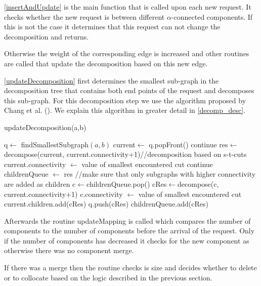 \documentclass[a4paper,xcolor=dvipsnames, tikz, 12pt]{article}
\theoremstyle{definition}
\begin{document}
\cref{insertAndUpdate} is the main function that is called upon each new request. It checks whether the new request is between different $\alpha$-connected components. If this is not the case it determines that this request can not change the decomposition and returns.

Otherwise the weight of the corresponding edge is increased and other routines are called that update the decomposition based on this new edge.

\cref{updateDecomposition} first determines the smallest sub-graph in the decomposition tree that contains both end points of the request and decomposes this sub-graph. For this decomposition step we use the algorithm proposed by Chang et al. (\cite{Chang2013}). We explain this algorithm in greater detail in \cref{decomp_desc}.

\begin{algorithm}
	\caption{updateDecomposition(a,b)}
	\label{updateDecomposition}
	\begin{algorithmic}
		\STATE q$\leftarrow$ findSmallestSubgraph$(a,b)$
		\STATE current$\leftarrow$ q.popFront()
		\STATE continue
		\ENDIF
		\STATE res$\leftarrow$ decompose(current, current.connectivity+1)//decomposition based on s-t-cuts
		\STATE current.connectivity $\leftarrow$ value of smallest encountered cut
		\STATE continue
		\ENDIF
		\STATE childrenQueue $\leftarrow$ res
		\STATE //make sure that only subgraphs with higher connectivity are added as children
		\STATE c$\leftarrow$childrenQueue.pop()
		\STATE cRes$\leftarrow$decompose(c, current.connectivity+1)
		\STATE c.connectivity $\leftarrow$ value of smallest encountered cut
		\STATE current.children.add(cRes)
		\STATE q.push(cRes)
		\ENDIF
		\ELSE
		\STATE childrenQueue.add(cRes)
		\ENDIF
		\ENDWHILE
		\ENDWHILE
	\end{algorithmic}		
\end{algorithm}

Afterwards the routine updateMapping is called which compares the number of components to the number of components before the arrival of the request. Only if the number of components has decreased it checks for the new component as otherwise there was no component merge. 

If there was a merge then the routine checks is size and decides whether to delete or to collocate based on the logic described in the previous section.
\end{document}
